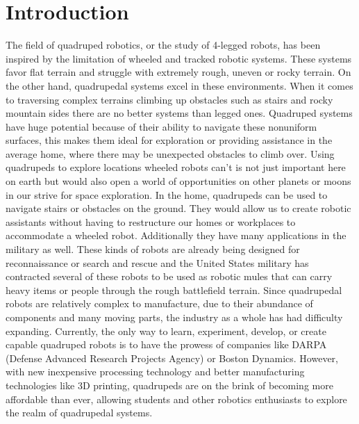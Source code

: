 \section{Introduction} \label{chap:Introduction}


    The field of quadruped robotics, or the study of 4-legged robots, has been inspired by the limitation of wheeled and tracked robotic systems. These systems favor flat terrain and struggle with extremely rough, uneven or rocky terrain. On the other hand, quadrupedal systems excel in these environments. When it comes to traversing complex terrains climbing up obstacles such as stairs and rocky mountain sides there are no better systems than legged ones. Quadruped systems have huge potential because of their ability to navigate these nonuniform surfaces, this makes them ideal for exploration or providing assistance in the average home, where there may be unexpected obstacles to climb over. Using quadrupeds to explore locations wheeled robots can't is not just important here on earth but would also open a world of opportunities on other planets or moons in our strive for space exploration. In the home, quadrupeds can be used to navigate stairs or obstacles on the ground. They would allow us to create robotic assistants without having to restructure our homes or workplaces to accommodate a wheeled robot. Additionally they have many applications in the military as well. These kinds of robots are already being designed for reconnaissance or search and rescue and the United States military has contracted several of these robots to be used as robotic mules that can carry heavy items or people through the rough battlefield terrain. Since quadrupedal robots are relatively complex to manufacture, due to their abundance of components and many moving parts, the industry as a whole has had difficulty expanding. Currently, the only way to learn, experiment, develop, or create capable quadruped robots is to have the prowess of companies like DARPA (Defense Advanced Research Projects Agency) or Boston Dynamics. However, with new inexpensive processing technology and better manufacturing technologies like 3D printing, quadrupeds are on the brink of becoming more affordable than ever, allowing students and other robotics enthusiasts to explore the realm of quadrupedal systems.

